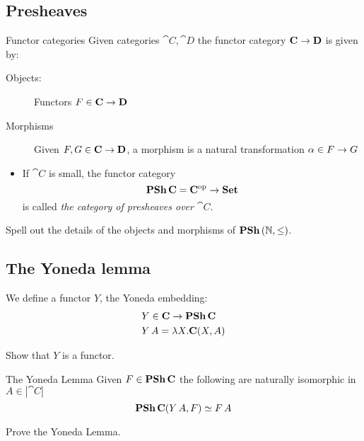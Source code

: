 \documentclass[handout]{beamer}
\begin{document}
\subsection{Presheaves}

\begin{frame}

  \begin{block}{Functor categories}
    Given categories $\cat{C},\cat{D}$ the functor category $\mathbf{C}\to \mathbf{D}$ is given by:
    \begin{description}
    \item[Objects:] Functors $F\in \mathbf{C} \to \mathbf{D}$

    \item[Morphisms] Given $F,G \in \mathbf{C} \to \mathbf{D}$, a morphism
      is a natural transformation $\alpha \in F \to G$
    \end{description}
  \end{block}
  
  \begin{itemize}
  \item If $\cat{C}$ is small, the functor category 
     \[\mathbf{PSh}\,\mathbf{C} = \mathbf{C}^{\mathrm{op}}\to \mathbf{Set} \]
    is called \emph{the category of presheaves over $\cat{C}$}.
  \end{itemize}

  \begin{exercise}
    Spell out the details of the objects and morphisms
    of $\mathbf{PSh}\,(\mathbb{N},\leq)$.    
  \end{exercise}

\end{frame}

\subsection{The Yoneda lemma}

\begin{frame}

  \begin{block}{}
    We define a functor $Y$, the Yoneda embedding:
        \begin{align*}
      & Y \in \mathbf{C} \to \mathbf{PSh}\,\mathbf{C}\\
      & Y\,A = \lambda X.\mathbf{C}(X,A)
    \end{align*}
  \end{block}

  \begin{exercise}
    Show that $Y$ is a functor.
  \end{exercise}

  \begin{block}{The Yoneda Lemma}
    Given $F\in\mathbf{PSh}\,\mathbf{C}$ the following are naturally isomorphic
    in $A\in|\cat{C}|$
    \[ \mathbf{\mathbf{PSh}\,\mathbf{C}}(Y\,A,F) \simeq F\,A\]
  \end{block}

  \begin{exercise}
    Prove the Yoneda Lemma.
  \end{exercise}
\end{frame}
\end{document}

